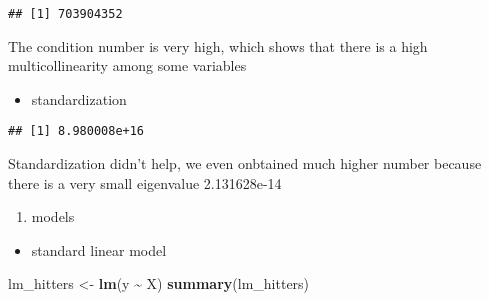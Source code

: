 \documentclass[
]{article}
\newenvironment{Shaded}{\begin{snugshade}}{\end{snugshade}}
\newcommand{\FunctionTok}[1]{\textcolor[rgb]{0.13,0.29,0.53}{\textbf{#1}}}
\newcommand{\NormalTok}[1]{#1}
\newcommand{\OtherTok}[1]{\textcolor[rgb]{0.56,0.35,0.01}{#1}}
\newcommand{\SpecialCharTok}[1]{\textcolor[rgb]{0.81,0.36,0.00}{\textbf{#1}}}
\providecommand{\tightlist}{%
  \setlength{\itemsep}{0pt}\setlength{\parskip}{0pt}}
\begin{document}
\begin{verbatim}
## [1] 703904352
\end{verbatim}

The condition number is very high, which shows that there is a high
multicollinearity among some variables

\begin{itemize}
\tightlist
\item
  standardization
\end{itemize}

\begin{Shaded}
\end{Shaded}

\begin{verbatim}
## [1] 8.980008e+16
\end{verbatim}

Standardization didn't help, we even onbtained much higher number
because there is a very small eigenvalue 2.131628e-14

\begin{enumerate}
\def\labelenumi{\alph{enumi}.}
\setcounter{enumi}{2}
\tightlist
\item
  models
\end{enumerate}

\begin{itemize}
\tightlist
\item
  standard linear model
\end{itemize}

\begin{Shaded}
\begin{Highlighting}[]
\NormalTok{lm\_hitters }\OtherTok{\textless{}{-}} \FunctionTok{lm}\NormalTok{(y }\SpecialCharTok{\textasciitilde{}}\NormalTok{ X)}
\FunctionTok{summary}\NormalTok{(lm\_hitters)}
\end{Highlighting}
\end{Shaded}
\end{document}
